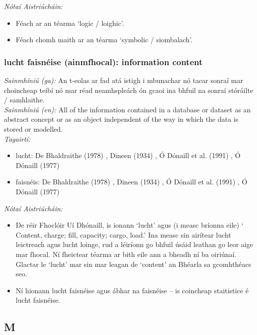 \documentclass{article}
\begin{document}
 \noindent \textit{Nótaí Aistriúcháin:}
\begin{itemize}
	\item Féach ar an téarma `logic / loighic'.
	\item Féach chomh maith ar an téarma `symbolic / siombalach'.
\end{itemize}


\subsubsection*{lucht faisnéise (ainmfhocal): information content}
 \noindent \textit{Sainmhíniú (ga):} An t-eolas ar fad atá istigh i mbunachar nó tacar sonraí mar choincheap teibí nó mar réad neamhspleách ón gcaoi ina bhfuil na sonraí stóráilte / samhlaithe.
\\
 \noindent \textit{Sainmhíniú (en):} All of the information contained in a database or dataset as an abstract concept or as an object independent of the way in which the data is stored or modelled.
\\
 \noindent \textit{Tagairtí:}
\begin{itemize}
	\item lucht: De Bhaldraithe (1978) \cite{de-bhaldraithe}, Dineen (1934) \cite{dineen}, Ó Dónaill et al. (1991) \cite{focloir-beag}, Ó Dónaill (1977) \cite{odonaill}
	\item faisnéis: De Bhaldraithe (1978) \cite{de-bhaldraithe}, Dineen (1934) \cite{dineen}, Ó Dónaill et al. (1991) \cite{focloir-beag}, Ó Dónaill (1977) \cite{odonaill}
\end{itemize}

 \noindent \textit{Nótaí Aistriúcháin:}
\begin{itemize}
	\item De réir Fhoclóir Uí Dhónaill, is ionann `lucht' agus (i measc bríonna eile) ` Content, charge; fill, capacity; cargo, load.' Ina measc sin airítear lucht leictreach agus lucht loinge, rud a léiríonn go bhfuil úsáid leathan go leor aige mar fhocal. Ní fheictear téarma ar bith eile ann a bheadh ní ba oiriúnaí. Glactar le `lucht' mar sin mar leagan de `content' an Bhéarla sa gcomhthéacs seo.
	\item Ní hionann lucht faisnéise agus ábhar na faisnéise -- is coincheap staitistice é lucht faisnéise.
\end{itemize}


\subsection*{M}
\end{document}
